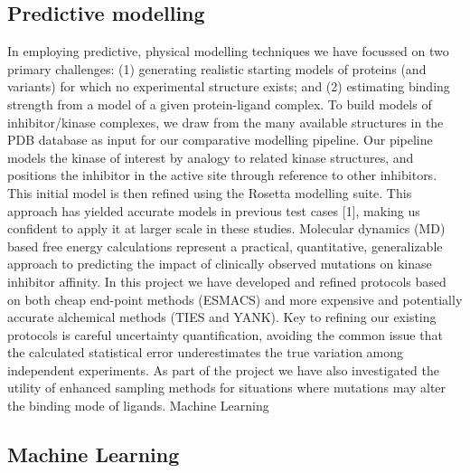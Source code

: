 \subsection{Predictive modelling}


In employing predictive, physical modelling techniques we have focussed on two
primary challenges: (1) generating realistic starting models of proteins (and
variants) for which no experimental structure exists; and (2) estimating
binding strength from a model of a given protein-ligand complex. To build
models of inhibitor/kinase complexes, we draw from the many available
structures in the PDB database as input for our comparative modelling
pipeline. Our pipeline models the kinase of interest by analogy to related
kinase structures, and positions the inhibitor in the active site through
reference to other inhibitors. This initial model is then refined using the
Rosetta modelling suite. This approach has yielded accurate models in previous
test cases [1], making us confident to apply it at larger scale in these
studies. Molecular dynamics (MD) based free energy calculations represent a
practical, quantitative, generalizable approach to predicting the impact of
clinically observed mutations on kinase inhibitor affinity. In this project we
have developed and refined protocols based on both cheap end-point methods
(ESMACS) and more expensive and potentially accurate alchemical methods (TIES
and YANK).  Key to refining our existing protocols is careful
uncertainty quantification, avoiding the common issue that the calculated
statistical error underestimates the true variation among independent
experiments. As part of the project we have also investigated the utility of
enhanced sampling methods for situations where mutations may alter the binding
mode of ligands. Machine Learning

\subsection{Machine Learning}

